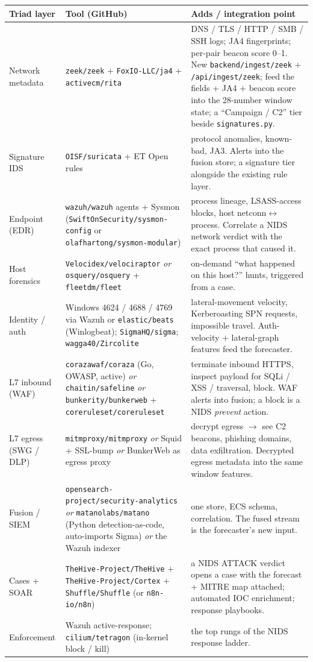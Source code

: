 \documentclass[11pt,a4paper]{article}
\begin{document}
\begin{longtable}{@{}p{2.7cm}p{4.6cm}p{6.6cm}@{}}
\toprule
\textbf{Triad layer} & \textbf{Tool (GitHub)} & \textbf{Adds / integration point} \\
\midrule \endhead \bottomrule \endfoot
Network metadata & \texttt{zeek/zeek} + \texttt{FoxIO-LLC/ja4} + \texttt{activecm/rita} &
  DNS / TLS / HTTP / SMB / SSH logs; JA4 fingerprints; per-pair beacon score
  0--1. New \texttt{backend/ingest/zeek} + \texttt{/api/ingest/zeek}; feed the
  fields + JA4 + beacon score into the 28-number window state; a ``Campaign /
  C2'' tier beside \texttt{signatures.py}. \\
Signature IDS & \texttt{OISF/suricata} + ET Open rules & protocol anomalies,
  known-bad, JA3. Alerts into the fusion store; a signature tier alongside the
  existing rule layer. \\
Endpoint (EDR) & \texttt{wazuh/wazuh} agents + Sysmon
  (\texttt{SwiftOnSecurity/sysmon-config} or \texttt{olafhartong/sysmon-modular}) &
  process lineage, LSASS-access blocks, host netconn$\leftrightarrow$process.
  Correlate a NIDS network verdict with the exact process that caused it. \\
Host forensics & \texttt{Velocidex/velociraptor} \emph{or}
  \texttt{osquery/osquery} + \texttt{fleetdm/fleet} & on-demand ``what happened
  on this host?'' hunts, triggered from a case. \\
Identity / auth & Windows 4624 / 4688 / 4769 via Wazuh or \texttt{elastic/beats}
  (Winlogbeat); \texttt{SigmaHQ/sigma}; \texttt{wagga40/Zircolite} &
  lateral-movement velocity, Kerberoasting SPN requests, impossible travel.
  Auth-velocity + lateral-graph features feed the forecaster. \\
L7 inbound (WAF) & \texttt{corazawaf/coraza} (Go, OWASP, active) \emph{or}
  \texttt{chaitin/safeline} \emph{or} \texttt{bunkerity/bunkerweb} +
  \texttt{coreruleset/coreruleset} & terminate inbound HTTPS, inspect payload for
  SQLi / XSS / traversal, block. WAF alerts into fusion; a block is a NIDS
  \emph{prevent} action. \\
L7 egress (SWG / DLP) & \texttt{mitmproxy/mitmproxy} \emph{or} Squid + SSL-bump
  \emph{or} BunkerWeb as egress proxy & decrypt egress $\rightarrow$ see C2
  beacons, phishing domains, data exfiltration. Decrypted egress metadata into
  the same window features. \\
Fusion / SIEM & \texttt{opensearch-project/security-analytics} \emph{or}
  \texttt{matanolabs/matano} (Python detection-as-code, auto-imports Sigma)
  \emph{or} the Wazuh indexer & one store, ECS schema, correlation. The fused
  stream is the forecaster's new input. \\
Cases + SOAR & \texttt{TheHive-Project/TheHive} + \texttt{TheHive-Project/Cortex}
  + \texttt{Shuffle/Shuffle} (or \texttt{n8n-io/n8n}) & a NIDS ATTACK verdict
  opens a case with the forecast + MITRE map attached; automated IOC enrichment;
  response playbooks. \\
Enforcement & Wazuh active-response; \texttt{cilium/tetragon} (in-kernel
  block / kill) & the top rungs of the NIDS response ladder. \\
\end{longtable}
\end{document}
